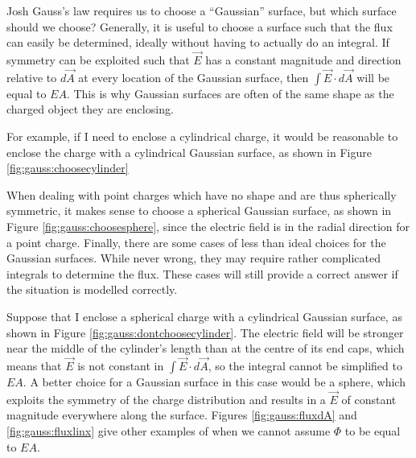\begin{studentOpinion}{Josh}	
Gauss's law requires us to choose a ``Gaussian'' surface, but which surface should we choose? Generally, it is useful to choose a surface such that the flux can easily be determined, ideally without having to actually do an integral. If symmetry can be exploited such that $\vec E$ has a constant magnitude and direction relative to $d\vec A$ at every location of the Gaussian surface, then $\int \vec E \cdot d\vec A$ will be equal to $E A$. This is why Gaussian surfaces are often of the same shape as the charged object they are enclosing.
	
For example, if I need to enclose a cylindrical charge, it would be reasonable to enclose the charge with a cylindrical Gaussian surface, as shown in Figure \ref{fig:gauss:choosecylinder}
	
When dealing with point charges which have no shape and are thus spherically symmetric, it makes sense to choose a spherical Gaussian surface, as shown in Figure \ref{fig:gauss:choosesphere}, since the electric field is in the radial direction for a point charge.
Finally, there are some cases of less than ideal choices for the Gaussian surfaces. While never wrong, they may require rather complicated integrals to determine the flux. These cases will still provide a correct answer if the situation is modelled correctly.

Suppose that I enclose a spherical charge with a cylindrical Gaussian surface, as shown in Figure \ref{fig:gauss:dontchoosecylinder}. The electric field will be stronger near the middle of the cylinder's length than at the centre of its end caps, which means that $\vec E$ is not constant in $\int \vec E \cdot d \vec A$, so the integral cannot be simplified to $EA$. A better choice for a Gaussian surface in this case would be a sphere, which exploits the symmetry of the charge distribution and results in a $\vec E$ of constant magnitude everywhere along the surface. Figures \ref{fig:gauss:fluxdA} and \ref{fig:gauss:fluxlinx} give other examples of when we cannot assume $\Phi$ to be equal to $EA$.
\end{studentOpinion}

